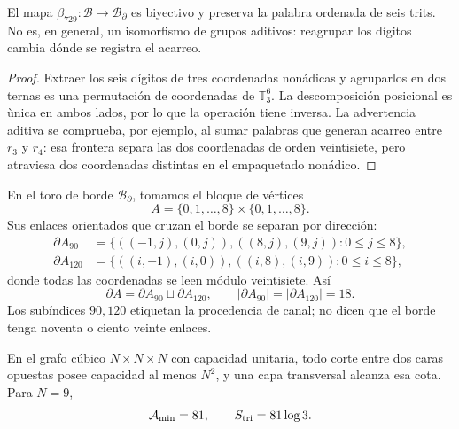 \begin{proposition}
\label{rm:prop:modular-beta729}
El mapa \(\beta_{729}:\mathcal B\to\mathcal B_\partial\) es biyectivo y
preserva la palabra ordenada de seis trits. No es, en general, un
isomorfismo de grupos aditivos: reagrupar los d\'igitos cambia d\'onde se
registra el acarreo.
\end{proposition}

\begin{proof}
Extraer los seis d\'igitos de tres coordenadas non\'adicas y agruparlos en
dos ternas es una permutaci\'on de coordenadas de \(\mathbb T_3^6\). La
descomposici\'on posicional es \`unica en ambos lados, por lo que la
operaci\'on tiene inversa. La advertencia aditiva se comprueba, por ejemplo,
al sumar palabras que generan acarreo entre \(r_3\) y \(r_4\): esa
frontera separa las dos coordenadas de orden veintisiete, pero atraviesa
dos coordenadas distintas en el empaquetado non\'adico.
\end{proof}

En el toro de borde \(\mathcal B_\partial\), tomamos el bloque de v\'ertices
\begin{equation}
\label{rm:eq:modular-block-A}
A=\{0,1,\ldots,8\}\times\{0,1,\ldots,8\}.
\end{equation}
Sus enlaces orientados que cruzan el borde se separan por direcci\'on:
\begin{align}
\partial A_{90}
&=\{((-1,j),(0,j)),((8,j),(9,j)):0\leq j\leq8\},
\label{rm:eq:modular-boundary90}\\
\partial A_{120}
&=\{((i,-1),(i,0)),((i,8),(i,9)):0\leq i\leq8\},
\label{rm:eq:modular-boundary120}
\end{align}
donde todas las coordenadas se leen m\'odulo veintisiete. As\'i
\begin{equation}
\label{rm:eq:modular-boundary-counts}
\partial A=\partial A_{90}\sqcup\partial A_{120},
\qquad
|\partial A_{90}|=|\partial A_{120}|=18.
\end{equation}
Los sub\'indices \(90,120\) etiquetan la procedencia de canal; no dicen que
el borde tenga noventa o ciento veinte enlaces.

\begin{theorem}
\label{rm:thm:modular-triadic-cut}
En el grafo c\'ubico \(N\times N\times N\) con capacidad unitaria, todo
corte entre dos caras opuestas posee capacidad al menos \(N^2\), y una
capa transversal alcanza esa cota. Para \(N=9\),
\begin{equation}
\label{rm:eq:modular-mincut-entropy}
\mathcal A_{\min}=81,
\qquad
S_{\rm tri}=81\log3.
\end{equation}
\end{theorem}

